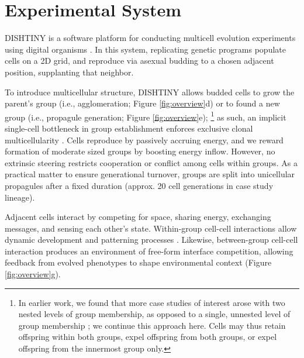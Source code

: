 \section{Experimental System}
\label{sec:system}



DISHTINY is a software platform for conducting multicell evolution experiments using digital organisms \citep{moreno2019toward}.
In this system, replicating genetic programs populate cells on a 2D grid, and reproduce via asexual budding to a chosen adjacent position, supplanting that neighbor.

To introduce multicellular structure, DISHTINY allows budded cells to grow the parent's group (i.e., agglomeration; Figure \ref{fig:overview}d) or to found a new group (i.e., propagule generation; Figure \ref{fig:overview}e);
\unskip\footnote{%
In earlier work, we found that more case studies of interest arose with two nested levels of group membership, as opposed to a single, unnested level of group membership \citep{moreno2021exploring}; we continue this approach here.
Cells may thus retain offspring within both groups, expel offspring from both groups, or expel offspring from the innermost group only.
}
as such, an implicit single-cell bottleneck in group establishment \unskip\citep{ratcliff2015origins} enforces exclusive clonal multicellularity \citep{rosrocher2026clonal,grosberg2007evolution}.
Cells reproduce by passively accruing energy, and we reward formation of moderate sized groups by boosting energy inflow.
However, no extrinsic steering restricts cooperation or conflict among cells within groups.
As a practical matter to ensure generational turnover, groups are split into unicellular propagules after a fixed duration (approx. 20 cell generations in case study lineage).

Adjacent cells interact by competing for space, sharing energy, exchanging messages, and sensing each other's state.
Within-group cell-cell interactions allow dynamic development and patterning processes \citep{goldsby2012task,moreno2021exploring}.
Likewise, between-group cell-cell interaction produces an environment of free-form interface competition, allowing feedback from evolved phenotypes to shape environmental context (Figure \ref{fig:overview}g).

